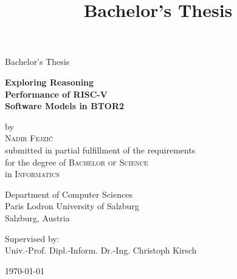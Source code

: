 \documentclass[12pt]{article}
\title{Bachelor's Thesis}
\begin{document}

\singlespacing
\thispagestyle{empty}
\begin{center}
\begin{minipage}{\linewidth}
\flushright
	      		 
\centering


\vspace*{\fill}
{\scshape{\Large Bachelor's Thesis\par}}

\vspace{1.5cm}
{\scshape{\LARGE \textbf{Exploring Reasoning\\
    Performance of RISC-V\\
    Software Models in BTOR2}\par}}

\large
\vspace{2.0cm}
by\\
\vspace{0.25cm}
    {\scshape{Nadir Fejzić}}\\


\vspace{1.5cm}
\noindent%
submitted in partial fulfillment of the requirements\\
    for the degree of
    {\scshape{Bachelor of Science}}\\
    in {\scshape{Informatics}}

\vspace{1.5cm}

\noindent%
\begin{center}
    Department of Computer Sciences\\
    Paris Lodron University of Salzburg\\
    Salzburg, Austria\\
\end{center}


\bigskip
\vspace{0.5cm}

Supervised by:\\
\vspace{0.25cm}
Univ.-Prof. Dipl.-Inform. Dr.-Ing. Christoph Kirsch
\end{minipage}

\vspace{1cm}

\today
\end{center}
\vspace*{\fill}
\end{document}

